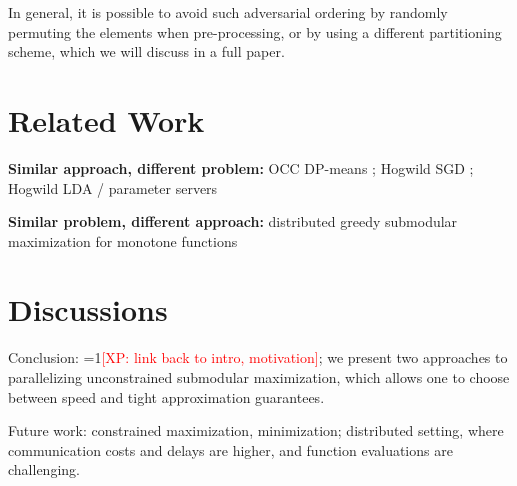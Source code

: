 \documentclass{article} %
\newcommand{\Comments}{1}
\newcommand{\note}[2]{\ifnum\Comments=1\textcolor{#1}{#2}\fi}
\newcommand{\xinghao}[1]{\note{red}{[XP: #1]}}
\begin{document}
In general, it is possible to avoid such adversarial ordering by randomly permuting the elements when pre-processing, or by using a different partitioning scheme, which we will discuss in a full paper.








\section{Related Work}
\textbf{Similar approach, different problem: } OCC DP-means \cite{pan2013}; Hogwild SGD \cite{Recht11}; Hogwild LDA \cite{Ahmed12} / parameter servers \cite{li2013, ho2013}

\textbf{Similar problem, different approach: } distributed greedy submodular maximization for monotone functions \cite{Mirzasoleiman2013}






\section{Discussions}

Conclusion: \xinghao{link back to intro, motivation}; we present two approaches to parallelizing unconstrained submodular maximization, which allows one to choose between speed and tight approximation guarantees.

Future work: constrained maximization, minimization; distributed setting, where communication costs and delays are higher, and function evaluations are challenging.


{\footnotesize




}
\end{document}
